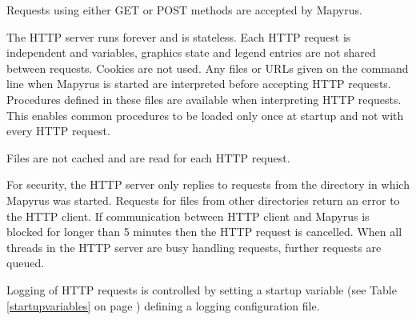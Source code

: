 Requests using either GET or POST methods are accepted by Mapyrus.

The HTTP server runs forever and
is stateless.  Each HTTP request is independent and
variables, graphics state and legend entries are not shared between
requests.  Cookies are not used.
Any files or URLs given on the command line when Mapyrus is started
are interpreted before accepting HTTP requests.
Procedures defined in these files
are available when interpreting HTTP requests.  This enables
common procedures to be loaded only once at startup and not with every
HTTP request.

Files are not cached and are read for each HTTP request.

For security, the HTTP server only replies to requests
from the directory in which Mapyrus was started.
Requests for files from other directories return an error to the HTTP client.
If communication between HTTP client and Mapyrus is blocked for longer than
5 minutes then the HTTP request is cancelled.
When all threads in the HTTP server are busy handling requests,
further requests are queued.

Logging of HTTP requests is controlled by setting a startup variable (see Table
\ref{startupvariables} on page \pageref{startupvariables}) defining a logging
configuration file.

